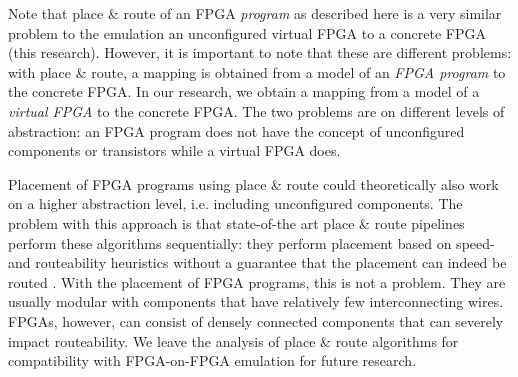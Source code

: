 \begin{minipage}{\textwidth}
\begin{important}
Note that place \& route of an FPGA \textit{program} as described here is a very similar problem to the emulation an unconfigured virtual FPGA to a concrete FPGA (this research). However, it is important to note that these are different problems: with place \& route, a mapping is obtained from a model of an \textit{FPGA program} to the concrete FPGA. In our research, we obtain a mapping from a model of a \textit{virtual FPGA} to the concrete FPGA. The two problems are on different levels of abstraction: an FPGA program does not have the concept of unconfigured components or transistors while a virtual FPGA does.

\vspace{.6cm}
Placement of FPGA programs using place \& route could theoretically also work on a higher abstraction level, i.e. including unconfigured components. The problem with this approach is that state-of-the art place \& route pipelines perform these algorithms sequentially: they perform placement based on speed- and routeability heuristics without a guarantee that the placement can indeed be routed \cite{alhyari2019}. With the placement of FPGA programs, this is not a problem. They are usually modular with components that have relatively few interconnecting wires. FPGAs, however, can consist of densely connected components that can severely impact routeability. We leave the analysis of place \& route algorithms for compatibility with FPGA-on-FPGA emulation for future research.
\end{important}
\end{minipage}


